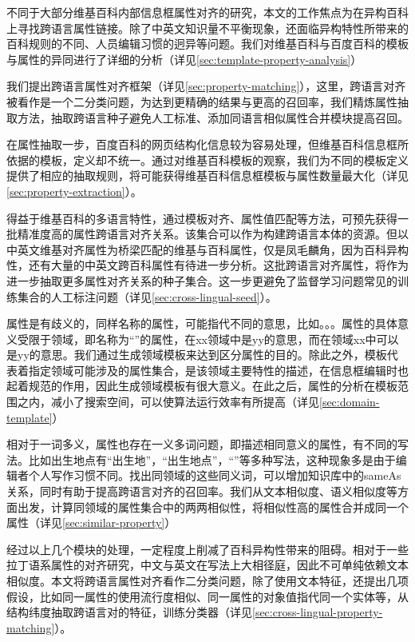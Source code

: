 不同于大部分维基百科内部信息框属性对齐的研究，本文的工作焦点为在异构百科上寻找跨语言属性链接。除了中英文知识量不平衡现象，还面临异构特性所带来的百科规则的不同、人员编辑习惯的迥异等问题。我们对维基百科与百度百科的模板与属性的异同进行了详细的分析（详见\ref{sec:template-property-analysis}）

我们提出跨语言属性对齐框架（详见\ref{sec:property-matching}），这里，跨语言对齐被看作是一个二分类问题，为达到更精确的结果与更高的召回率，我们精炼属性抽取方法，抽取跨语言种子避免人工标准、添加同语言相似属性合并模块提高召回。

在属性抽取一步，百度百科的网页结构化信息较为容易处理，但维基百科信息框所依据的模板，定义却不统一。通过对维基百科模板的观察，我们为不同的模板定义提供了相应的抽取规则，将可能获得维基百科信息框模板与属性数量最大化（详见\ref{sec:property-extraction}）。

得益于维基百科的多语言特性，通过模板对齐、属性值匹配等方法，可预先获得一批精准度高的属性跨语言对齐关系。该集合可以作为构建跨语言本体的资源。但以中英文维基对齐属性为桥梁匹配的维基与百科属性，仅是凤毛麟角，因为百科异构性，还有大量的中英文跨百科属性有待进一步分析。这批跨语言对齐属性，将作为进一步抽取更多属性对齐关系的种子集合。这一步更避免了监督学习问题常见的训练集合的人工标注问题（详见\ref{sec:cross-lingual-seed}）。

属性是有歧义的，同样名称的属性，可能指代不同的意思，比如。。。属性的具体意义受限于领域，即名称为“”的属性，在xx领域中是yy的意思，而在领域xx中可以是yy的意思。我们通过生成领域模板来达到区分属性的目的。除此之外，模板代表着指定领域可能涉及的属性集合，是该领域主要特性的描述，在信息框编辑时也起着规范的作用，因此生成领域模板有很大意义。在此之后，属性的分析在模板范围之内，减小了搜索空间，可以使算法运行效率有所提高（详见\ref{sec:domain-template}）

相对于一词多义，属性也存在一义多词问题，即描述相同意义的属性，有不同的写法。比如出生地点有“出生地”，“出生地点”，“”等多种写法，这种现象多是由于编辑者个人写作习惯不同。找出同领域的这些同义词，可以增加知识库中的sameAs关系，同时有助于提高跨语言对齐的召回率。我们从文本相似度、语义相似度等方面出发，计算同领域的属性集合中的两两相似性，将相似性高的属性合并成同一个属性（详见\ref{sec:similar-property}）

经过以上几个模块的处理，一定程度上削减了百科异构性带来的阻碍。相对于一些拉丁语系属性的对齐研究，中文与英文在写法上大相径庭，因此不可单纯依赖文本相似度。本文将跨语言属性对齐看作二分类问题，除了使用文本特征，还提出几项假设，比如同一属性的使用流行度相似、同一属性的对象值指代同一个实体等，从结构纬度抽取跨语言对的特征，训练分类器（详见\ref{sec:cross-lingual-property-matching}）。


